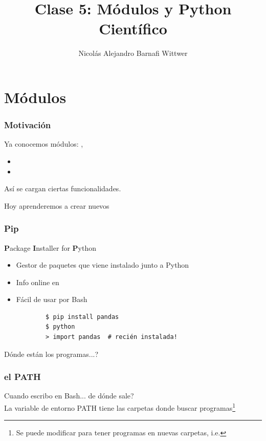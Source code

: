 \documentclass[14pt,aspectratio=169,xcolor=dvipsnames]{beamer}
\title[short title]{Clase 5: Módulos y Python Científico}
\subtitle{}
\author[NA Barnafi] {Nicolás Alejandro Barnafi Wittwer}
\institute[UC|CMM] 
{
    Pontificia Universidad Católica de Chile \\
    Centro de Modelamiento Matemático
}
\date{}
\begin{document}
\begin{frame}
    \maketitle
\end{frame}
\section{Módulos}
\begin{frame}[fragile]\frametitle{Motivación}
    Ya conocemos módulos: , 
    \begin{itemize}
        \item {}
        \item {}
    \end{itemize}
    Así se cargan ciertas funcionalidades. 

    \pause Hoy aprenderemos a crear nuevos
\end{frame}
\begin{frame}[fragile]\frametitle{Pip}
    \textbf{P}ackage \textbf{I}nstaller for \textbf{P}ython
    
    \begin{itemize}
        \item Gestor de paquetes que viene instalado junto a Python
        \item Info online en 
        \item Fácil de usar por Bash
            \begin{verbatim}
        $ pip install pandas
        $ python
        > import pandas  # recién instalada!
            \end{verbatim}
    \end{itemize}
    
    \pause Dónde están los programas...?
\end{frame}
\begin{frame}\frametitle{el PATH}
    Cuando escribo  en Bash... de dónde sale? \\

    \vspace{0.5cm}
    La variable de entorno PATH tiene las carpetas donde buscar programas\footnote{Se puede modificar para tener programas en nuevas carpetas, i.e. }

    \pause {}
\end{frame}
\end{document}
